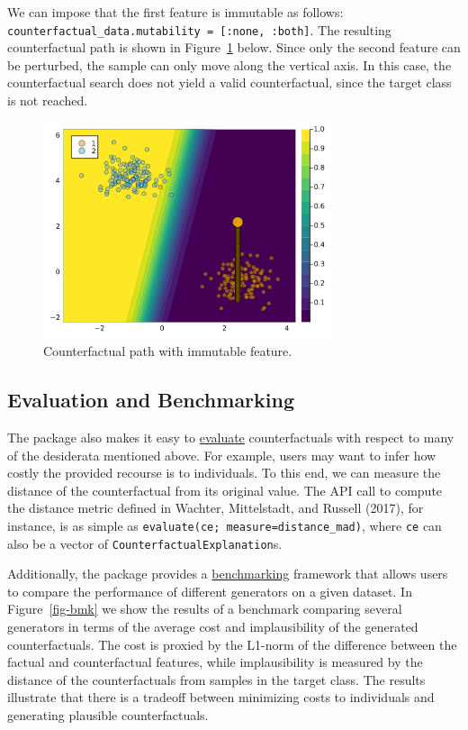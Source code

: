 \documentclass{juliacon}
\begin{document}
We can impose that the first feature is immutable as follows:
\texttt{counterfactual\_data.mutability\ =\ {[}:none,\ :both{]}}. The
resulting counterfactual path is shown in Figure~\ref{fig-mutability}
below. Since only the second feature can be perturbed, the sample can
only move along the vertical axis. In this case, the counterfactual
search does not yield a valid counterfactual, since the target class is
not reached.

\begin{figure}

{\centering \includegraphics[width=3.33333in,height=2.5in]{www/constraint_mutability.png}

}

\caption{\label{fig-mutability}Counterfactual path with immutable
feature.}

\end{figure}

\hypertarget{sec-eval}{%
\subsection{Evaluation and Benchmarking}\label{sec-eval}}

The package also makes it easy to
\href{https://juliatrustworthyai.github.io/CounterfactualExplanations.jl/v0.1/tutorials/evaluation/}{evaluate}
counterfactuals with respect to many of the desiderata mentioned above.
For example, users may want to infer how costly the provided recourse is
to individuals. To this end, we can measure the distance of the
counterfactual from its original value. The API call to compute the
distance metric defined in Wachter, Mittelstadt, and Russell (2017), for
instance, is as simple as \texttt{evaluate(ce;\ measure=distance\_mad)},
where \texttt{ce} can also be a vector of
\texttt{CounterfactualExplanation}s.

Additionally, the package provides a
\href{https://juliatrustworthyai.github.io/CounterfactualExplanations.jl/v0.1/tutorials/benchmarking/}{benchmarking}
framework that allows users to compare the performance of different
generators on a given dataset. In Figure~\ref{fig-bmk} we show the
results of a benchmark comparing several generators in terms of the
average cost and implausibility of the generated counterfactuals. The
cost is proxied by the L1-norm of the difference between the factual and
counterfactual features, while implausibility is measured by the
distance of the counterfactuals from samples in the target class. The
results illustrate that there is a tradeoff between minimizing costs to
individuals and generating plausible counterfactuals.
\end{document}
